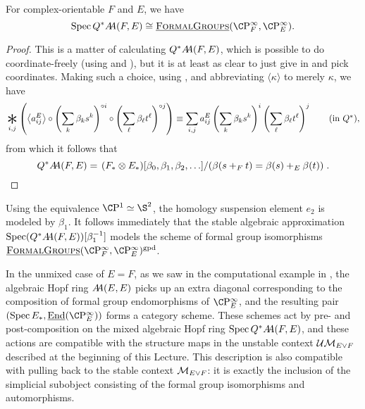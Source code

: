 \begin{corollary}
For complex-orientable \(F\) and \(E\), we have \[\Spec Q^* \AA(F, E) \cong \InternalHom{FormalGroups}(\CP^\infty_F, \CP^\infty_E).\]
\end{corollary}
\begin{proof}
This is a matter of calculating \(Q^* \AA(F, E)\), which is possible to do coordinate-freely (using  and \cite[Proposition 6.15]{StricklandFSFG}), but it is at least as clear to just give in and pick coordinates.  Making such a choice, using , and abbreviating $\langle \kappa \rangle$ to merely $\kappa$, we have \[\bigast_{i, j} \left(\left\<a_{ij}^E\right\> \circ \left( \sum_k \beta_k s^k \right)^{\circ i} \circ \left( \sum_\ell \beta_\ell t^\ell \right)^{\circ j} \right) \equiv \sum_{i, j} a_{ij}^E \left( \sum_k \beta_k s^k \right)^i \left( \sum_\ell \beta_\ell t^\ell \right)^j \tag{in \(Q^*\)},\] from which it follows that \[Q^* \AA(F, E) = \left. (F_* \otimes E_*)[\beta_0, \beta_1, \beta_2, \ldots] \middle/ \left( \beta(s +_F t) = \beta(s) +_E \beta(t) \right) \right. . \qedhere\]
\end{proof}

\begin{remark}
Using the equivalence \(\CP^1 \simeq \S^2\), the homology suspension element \(e_2\) is modeled by \(\beta_1\).  It follows immediately that the stable algebraic approximation \(\Spec (Q^* \AA(F, E))[\beta_1^{-1}]\) models the scheme of formal group isomorphisms \(\InternalHom{FormalGroups}(\CP^\infty_F, \CP^\infty_E)^{\mathrm{gpd}}\).
\end{remark}

\begin{remark}
In the unmixed case of \(E = F\), as we saw in the computational example in , the algebraic Hopf ring \(\AA(E, E)\) picks up an extra diagonal corresponding to the composition of formal group endomorphisms of \(\CP^\infty_E\), and the resulting pair \((\Spec E_*, \underline{\operatorname{End}}(\CP^\infty_E))\) forms a category scheme.  These schemes act by pre- and post-composition on the mixed algebraic Hopf ring \(\Spec Q^* \AA(F, E)\), and these actions are compatible with the structure maps in the unstable context \(\Ucontext{E \vee F}\) described at the beginning of this Lecture.  This description is also compatible with pulling back to the stable context \(\context{E \vee F}\): it is exactly the inclusion of the simplicial subobject consisting of the formal group isomorphisms and automorphisms.
\end{remark}













